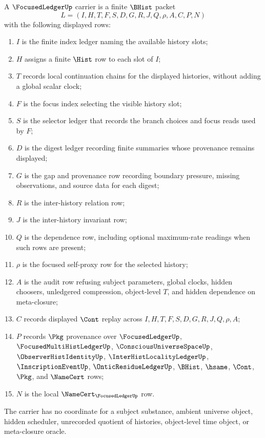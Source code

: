\begin{definition}
\label{def:focused-ledger-carrier}
A $\FocusedLedgerUp$ carrier is a finite $\BHist$ packet
$$
L=(I,H,T,F,S,D,G,R,J,Q,\rho,A,C,P,N)
$$
with the following displayed rows:
\begin{enumerate}
\item $I$ is the finite index ledger naming the available history slots;
\item $H$ assigns a finite $\Hist$ row to each slot of $I$;
\item $T$ records local continuation chains for the displayed histories, without adding a global scalar clock;
\item $F$ is the focus index selecting the visible history slot;
\item $S$ is the selector ledger that records the branch choices and focus reads used by $F$;
\item $D$ is the digest ledger recording finite summaries whose provenance remains displayed;
\item $G$ is the gap and provenance row recording boundary pressure, missing observations, and source data for each digest;
\item $R$ is the inter-history relation row;
\item $J$ is the inter-history invariant row;
\item $Q$ is the dependence row, including optional maximum-rate readings when such rows are present;
\item $\rho$ is the focused self-proxy row for the selected history;
\item $A$ is the audit row refusing subject parameters, global clocks, hidden choosers, unledgered compression, object-level $T$, and hidden dependence on meta-closure;
\item $C$ records displayed $\Cont$ replay across $I,H,T,F,S,D,G,R,J,Q,\rho,A$;
\item $P$ records $\Pkg$ provenance over $\FocusedLedgerUp$, $\FocusedMultiHistLedgerUp$, $\ConsciousUniverseSpaceUp$, $\ObserverHistIdentityUp$, $\InterHistLocalityLedgerUp$, $\InscriptionEventUp$, $\OnticResidueLedgerUp$, $\BHist$, $\hsame$, $\Cont$, $\Pkg$, and $\NameCert$ rows;
\item $N$ is the local $\NameCert_{\FocusedLedgerUp}$ row.
\end{enumerate}
The carrier has no coordinate for a subject substance, ambient universe object, hidden scheduler, unrecorded quotient of histories, object-level time object, or meta-closure oracle.
\end{definition}

